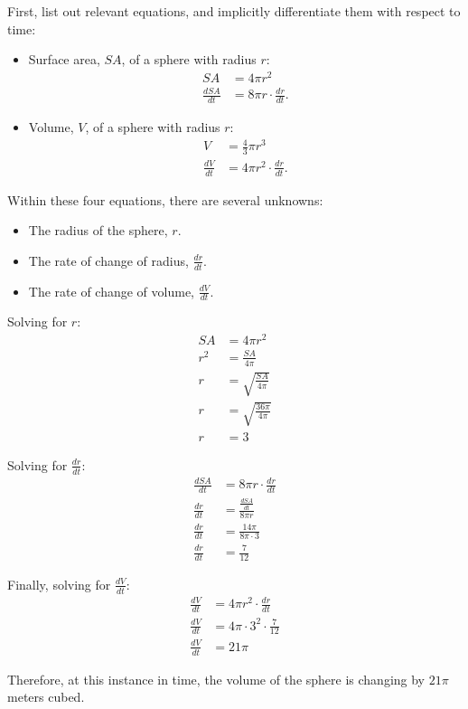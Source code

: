 \documentclass[12pt]{article}
\begin{document}
\begin{enumerate}
	First, list out relevant equations, and implicitly differentiate them with respect to time:
	\begin{itemize}
		\item Surface area, $SA$, of a sphere with radius $r$:
		\begin{align*}
			SA &= 4 \pi r^2 \\
			\frac{dSA}{dt} &= 8 \pi r \cdot \frac{dr}{dt}.
		\end{align*}

		\item Volume, $V$, of a sphere with radius $r$:
		\begin{align*}
			V &= \frac{4}{3} \pi r^3 \\[5pt]
			\frac{dV}{dt} &= 4 \pi r^2 \cdot \frac{dr}{dt}.
		\end{align*}
	\end{itemize}

	Within these four equations, there are several unknowns:
	\begin{itemize}
		\item The radius of the sphere, $r$.
		\item The rate of change of radius, $\frac{dr}{dt}$.
		\item The rate of change of volume, $\frac{dV}{dt}$.
	\end{itemize}

	Solving for $r$:
	\begin{align*}
		SA &= 4 \pi r^2 \\
		r^2 &= \frac{SA}{4 \pi} \\[5pt]
		r &= \sqrt{\frac{SA}{4 \pi}} \\[5pt]
		r &= \sqrt{\frac{36 \pi}{4 \pi}} \\[5pt]
		r &= 3
	\end{align*}

	Solving for $\frac{dr}{dt}$:
	\begin{align*}
		\frac{dSA}{dt} &= 8 \pi r \cdot \frac{dr}{dt} \\[5pt]
		\frac{dr}{dt} &= \frac{\frac{dSA}{dt}}{8 \pi r} \\[5pt]
		\frac{dr}{dt} &= \frac{14 \pi}{8 \pi \cdot 3} \\[5pt]
		\frac{dr}{dt} &= \frac{7}{12}
	\end{align*}

	Finally, solving for $\frac{dV}{dt}$:
	\begin{align*}
		\frac{dV}{dt} &= 4 \pi r^2 \cdot \frac{dr}{dt} \\[5pt]
		\frac{dV}{dt} &= 4 \pi \cdot 3^2 \cdot \frac{7}{12} \\[5pt]
		\frac{dV}{dt} &= 21 \pi
	\end{align*}

	Therefore, at this instance in time, the volume of the sphere is changing by $21 \pi$ meters cubed.
\end{enumerate}
\end{document}
